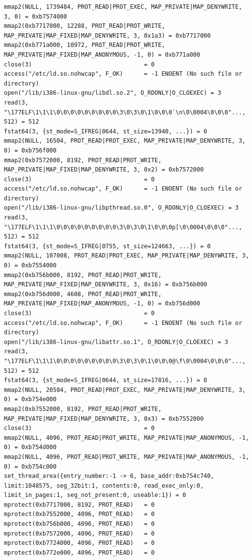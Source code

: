{\begin{shaded}
\begin{verbatim}
mmap2(NULL, 1739484, PROT_READ|PROT_EXEC, MAP_PRIVATE|MAP_DENYWRITE, 3, 0) = 0xb7574000
mmap2(0xb7717000, 12288, PROT_READ|PROT_WRITE, MAP_PRIVATE|MAP_FIXED|MAP_DENYWRITE, 3, 0x1a3) = 0xb7717000
mmap2(0xb771a000, 10972, PROT_READ|PROT_WRITE, MAP_PRIVATE|MAP_FIXED|MAP_ANONYMOUS, -1, 0) = 0xb771a000
close(3)                                = 0
access("/etc/ld.so.nohwcap", F_OK)      = -1 ENOENT (No such file or directory)
open("/lib/i386-linux-gnu/libdl.so.2", O_RDONLY|O_CLOEXEC) = 3
read(3, "\177ELF\1\1\1\0\0\0\0\0\0\0\0\0\3\0\3\0\1\0\0\0`\n\0\0004\0\0\0"..., 512) = 512
fstat64(3, {st_mode=S_IFREG|0644, st_size=13940, ...}) = 0
mmap2(NULL, 16504, PROT_READ|PROT_EXEC, MAP_PRIVATE|MAP_DENYWRITE, 3, 0) = 0xb756f000
mmap2(0xb7572000, 8192, PROT_READ|PROT_WRITE, MAP_PRIVATE|MAP_FIXED|MAP_DENYWRITE, 3, 0x2) = 0xb7572000
close(3)                                = 0
access("/etc/ld.so.nohwcap", F_OK)      = -1 ENOENT (No such file or directory)
open("/lib/i386-linux-gnu/libpthread.so.0", O_RDONLY|O_CLOEXEC) = 3
read(3, "\177ELF\1\1\1\0\0\0\0\0\0\0\0\0\3\0\3\0\1\0\0\0p[\0\0004\0\0\0"..., 512) = 512
fstat64(3, {st_mode=S_IFREG|0755, st_size=124663, ...}) = 0
mmap2(NULL, 107008, PROT_READ|PROT_EXEC, MAP_PRIVATE|MAP_DENYWRITE, 3, 0) = 0xb7554000
mmap2(0xb756b000, 8192, PROT_READ|PROT_WRITE, MAP_PRIVATE|MAP_FIXED|MAP_DENYWRITE, 3, 0x16) = 0xb756b000
mmap2(0xb756d000, 4608, PROT_READ|PROT_WRITE, MAP_PRIVATE|MAP_FIXED|MAP_ANONYMOUS, -1, 0) = 0xb756d000
close(3)                                = 0
access("/etc/ld.so.nohwcap", F_OK)      = -1 ENOENT (No such file or directory)
open("/lib/i386-linux-gnu/libattr.so.1", O_RDONLY|O_CLOEXEC) = 3
read(3, "\177ELF\1\1\1\0\0\0\0\0\0\0\0\0\3\0\3\0\1\0\0\0@\f\0\0004\0\0\0"..., 512) = 512
fstat64(3, {st_mode=S_IFREG|0644, st_size=17816, ...}) = 0
mmap2(NULL, 20584, PROT_READ|PROT_EXEC, MAP_PRIVATE|MAP_DENYWRITE, 3, 0) = 0xb754e000
mmap2(0xb7552000, 8192, PROT_READ|PROT_WRITE, MAP_PRIVATE|MAP_FIXED|MAP_DENYWRITE, 3, 0x3) = 0xb7552000
close(3)                                = 0
mmap2(NULL, 4096, PROT_READ|PROT_WRITE, MAP_PRIVATE|MAP_ANONYMOUS, -1, 0) = 0xb754d000
mmap2(NULL, 4096, PROT_READ|PROT_WRITE, MAP_PRIVATE|MAP_ANONYMOUS, -1, 0) = 0xb754c000
set_thread_area({entry_number:-1 -> 6, base_addr:0xb754c740, limit:1048575, seg_32bit:1, contents:0, read_exec_only:0, limit_in_pages:1, seg_not_present:0, useable:1}) = 0
mprotect(0xb7717000, 8192, PROT_READ)   = 0
mprotect(0xb7552000, 4096, PROT_READ)   = 0
mprotect(0xb756b000, 4096, PROT_READ)   = 0
mprotect(0xb7572000, 4096, PROT_READ)   = 0
mprotect(0xb7724000, 4096, PROT_READ)   = 0
mprotect(0xb772e000, 4096, PROT_READ)   = 0

\end{verbatim}
\end{shaded}}
